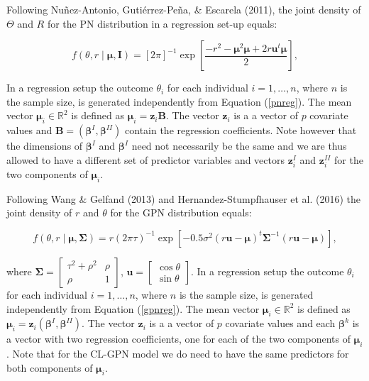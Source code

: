 \documentclass[11pt,]{article}
\begin{document}
Following Nuñez-Antonio, Gutiérrez-Peña, \& Escarela (2011), the joint
density of \(\Theta\) and \(R\) for the PN distribution in a regression
set-up equals:

\begin{equation}\label{pnreg}
f(\theta,r \mid \boldsymbol{\mu}, \boldsymbol{I}) = [2\pi]^{-1} \exp\left[ \frac{-r^2 - \boldsymbol{\mu}^2\boldsymbol{\mu} + 2r\boldsymbol{u}^t\boldsymbol{\mu}}{2}\right],
\end{equation}

In a regression setup the outcome \(\theta_i\) for each individual
\(i = 1, \dots, n\), where \(n\) is the sample size, is generated
independently from Equation (\ref{pnreg}). The mean vector
\(\boldsymbol{\mu}_i \in \mathbb{R}^2\) is defined as
\(\boldsymbol{\mu}_i = \boldsymbol{z}_i\boldsymbol{B}\). The vector
\(\boldsymbol{z}_i\) is a a vector of \(p\) covariate values and
\(\boldsymbol{B} = (\boldsymbol{\beta}^{I}, \boldsymbol{\beta}^{II})\)
contain the regression coefficients. Note however that the dimensions of
\(\boldsymbol{\beta}^{I}\) and \(\boldsymbol{\beta }^{I}\) need not
necessarily be the same and we are thus allowed to have a different set
of predictor variables and vectors \(\boldsymbol{z}_i^I\) and
\(\boldsymbol{z}_i^{II}\) for the two components of
\(\boldsymbol{\mu}_i\).

Following Wang \& Gelfand (2013) and Hernandez-Stumpfhauser et al.
(2016) the joint density of \(r\) and \(\theta\) for the GPN
distribution equals:

\begin{equation}\label{gpnreg}
f(\theta, r \mid \boldsymbol{\mu}, \boldsymbol{\Sigma}) = r(2\pi\tau)^{-1} \exp\left[ -0.5 \sigma^2(r\boldsymbol{u}-\boldsymbol{\mu})^{t}\boldsymbol{\Sigma}^{-1}(r\boldsymbol{u}-\boldsymbol{\mu})\right],
\end{equation}

where
\(\boldsymbol{\Sigma} = \begin{bmatrix} \tau^2 + \rho^2 & \rho\\ \rho & 1 \end{bmatrix}\),
\(\boldsymbol{u}= \begin{bmatrix} \cos \theta \\ \sin \theta \end{bmatrix}\).
In a regression setup the outcome \(\theta_i\) for each individual
\(i = 1, \dots, n\), where \(n\) is the sample size, is generated
independently from Equation (\ref{gpnreg}). The mean vector
\(\boldsymbol{\mu}_i \in \mathbb{R}^2\) is defined as
\(\boldsymbol{\mu}_i = \boldsymbol{z}_i(\boldsymbol{\beta}^{I}, \boldsymbol{\beta}^{II})\).
The vector \(\boldsymbol{z}_i\) is a a vector of \(p\) covariate values
and each \(\boldsymbol{\beta}^{k}\) is a vector with two regression
coefficients, one for each of the two components of
\(\boldsymbol{\mu}_i\). Note that for the CL-GPN model we do need to
have the same predictors for both components of \(\boldsymbol{\mu}_i\).
\end{document}

